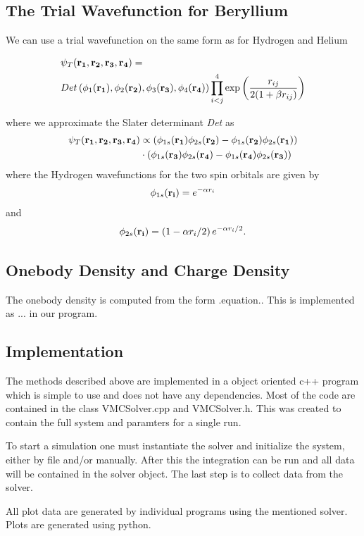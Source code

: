 \documentclass[twocolumn]{article}[12pt]
\newcommand{\eq}[1]{\begin{align*}#1\end{align*}}
\begin{document}
\subsection{The Trial Wavefunction for Beryllium}
We can use a trial wavefunction on the same form as for
Hydrogen and Helium

{\small
\eq{
	&\psi_{T}({\bf r_1},{\bf r_2}, {\bf r_3}, {\bf r_4}) =\\ 
 	&Det\left(\phi_{1}({\bf r_1}),\phi_{2}({\bf r_2}),
   	\phi_{3}({\bf r_3}),\phi_{4}({\bf r_4})\right)
   	\prod_{i<j}^{4}\exp{\left(\frac{r_{ij}}{2(1+\beta r_{ij})}\right)}
}}%

where we approximate the Slater determinant \textit{Det} as
{\small
\eq{
	\psi_{T}({\bf r_1},{\bf r_2}, {\bf r_3}, {\bf r_4})&\propto 
	\left(\phi_{1s}({\bf r_1})\phi_{2s}({\bf r_2})-\phi_{1s}({\bf r_2})
	\phi_{2s}({\bf r_1})\right)\\
	&\cdot\left(\phi_{1s}({\bf r_3})\phi_{2s}({\bf r_4})
	-\phi_{1s}({\bf r_4})\phi_{2s}({\bf r_3})\right)
}}%
where the Hydrogen wavefunctions for the two spin orbitals
are given by
{\small\eq{
\phi_{1s}({\bf r_i}) = e^{-\alpha r_i}\\
}}
and
{\small\eq{
\phi_{2s}({\bf r_i}) = \left(1-\alpha r_i/2\right)e^{-\alpha r_i/2}.
}}

\subsection{Onebody Density and Charge Density}
The onebody density is computed from the form .equation.. 
This is implemented as ... in our program. 

\subsection{Implementation}
The methods described above are implemented in a object oriented c++ program
which is simple to use and does not have any dependencies. Most of the code
are contained in the class VMCSolver.cpp and VMCSolver.h. This was created 
to contain the full system and paramters for a single run. 

To start a simulation one must instantiate the solver and 
initialize the system, either by file and/or manually. After this
 the integration can be run and all data will be contained in the solver object.
The last step is to collect data from the solver. 

All plot data are generated by individual programs using the mentioned solver. 
Plots are generated using python. 
\end{document}
